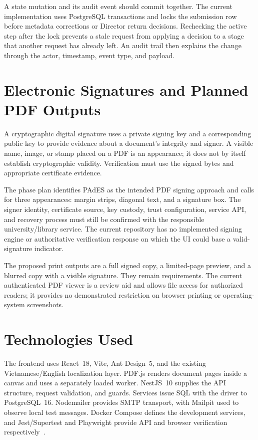 \documentclass[11pt,a4paper]{report}
\newcommand{\code}[1]{{\small\texttt{\detokenize{#1}}}}
\begin{document}
A state mutation and its audit event should commit together. The current implementation uses PostgreSQL transactions and locks the submission row before metadata corrections or Director return decisions. Rechecking the active step after the lock prevents a stale request from applying a decision to a stage that another request has already left. An audit trail then explains the change through the actor, timestamp, event type, and payload.

\section{Electronic Signatures and Planned PDF Outputs}
A cryptographic digital signature uses a private signing key and a corresponding public key to provide evidence about a document's integrity and signer. A visible name, image, or stamp placed on a PDF is an appearance; it does not by itself establish cryptographic validity. Verification must use the signed bytes and appropriate certificate evidence.

The phase plan identifies PAdES as the intended PDF signing approach and calls for three appearances: margin strips, diagonal text, and a signature box. The signer identity, certificate source, key custody, trust configuration, service API, and recovery process must still be confirmed with the responsible university/library service. The current repository has no implemented signing engine or authoritative verification response on which the UI could base a valid-signature indicator.

The proposed print outputs are a full signed copy, a limited-page preview, and a blurred copy with a visible signature. They remain requirements. The current authenticated PDF viewer is a review aid and allows file access for authorized readers; it provides no demonstrated restriction on browser printing or operating-system screenshots.

\section{Technologies Used}
The frontend uses React~18, Vite, Ant Design~5, and the existing Vietnamese/English localization layer. PDF.js renders document pages inside a canvas and uses a separately loaded worker. NestJS~10 supplies the API structure, request validation, and guards. Services issue SQL with the \code{pg} driver to PostgreSQL~16. Nodemailer provides SMTP transport, with Mailpit used to observe local test messages. Docker Compose defines the development services, and Jest/Supertest and Playwright provide API and browser verification respectively~\cite{source-snapshot,validation}.
\end{document}
